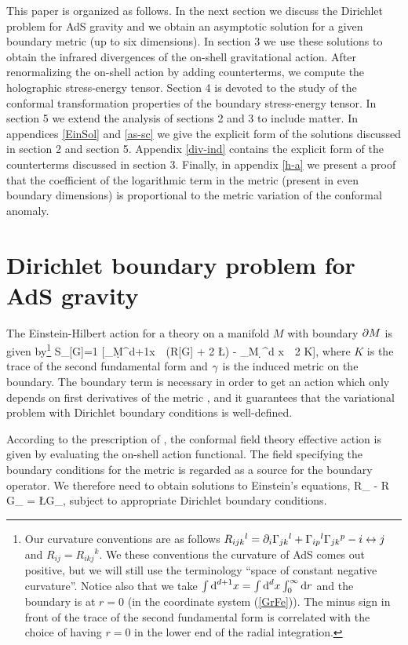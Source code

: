 This paper is organized as follows. In the next section we discuss 
the Dirichlet problem for AdS gravity and we obtain an asymptotic 
solution for a given boundary metric (up to six dimensions).
In section 3 we use these solutions to obtain 
the infrared divergences of the on-shell gravitational action.
After renormalizing the on-shell action by adding counterterms,
we compute the holographic stress-energy tensor. Section 4 is devoted
to the study of the conformal transformation properties of the 
boundary stress-energy tensor. In section 5 we extend the analysis
of sections 2 and 3 to include matter. 
In appendices \ref{EinSol} and \ref{as-sc}
we give  the explicit form of the solutions discussed 
in section 2 and section 5. Appendix \ref{div-ind}
contains the explicit form of the counterterms discussed 
in section 3. 
Finally, in appendix \ref{h-a} we present a proof that the coefficient
of the logarithmic term in the metric (present in even 
boundary dimensions)
is proportional to the metric variation of the conformal anomaly.

\section{Dirichlet boundary problem for AdS gravity}
\setcounter{equation}{0}

The Einstein-Hilbert action for a theory on a manifold $M$ 
with boundary $\partial M$ is given by\footnote{
Our curvature conventions are as follows
$R_{ijk}{}^l=\partial_i \Gamma_{jk}{}^l + \Gamma_{ip}{}^l \Gamma_{jk}{}^p - i
\leftrightarrow j$ and $R_{ij}=R_{ikj}{}^k$. We these conventions
the curvature of AdS comes out positive, but we will 
still use the terminology ``space of constant negative
curvature''. Notice also that we take
$\int \mbox{d}^{d+1} x = \int \mbox{d}^d x \int_0^\infty \mbox{d} r$
and the boundary is at $r=0$ (in the coordinate system (\ref{GrFe})). 
The minus sign in front of the trace of the second 
fundamental form is correlated with the choice of having $r=0$ in 
the lower end of the radial integration.} 
\be \label{action}
S_{}[G]={1  \p \GN}[\int_{M}\d^{d+1}x\, 
\, (R[G] + 2 \L) 
- \int_{\pa M} \d^d x\, \sqrt{\c}\, 2 K],
\ee
where $K$ is the trace of the second fundamental form and
$\gamma$ is the induced metric on the boundary. The 
boundary term is necessary in order to get an action which 
only depends on first derivatives of the metric \cite{GibbonsHawking},
and it guarantees that the variational 
problem with Dirichlet boundary conditions is well-defined.

According to the prescription of \cite{Gubs,Wit}, the conformal 
field theory effective action is given by evaluating the 
on-shell action functional. The field specifying the 
boundary conditions for the metric is regarded as a source 
for the boundary operator. We therefore need to obtain solutions
to Einstein's equations,
\be \label{feq1}
R_{\m \n} - \half R G_{\m \n} = \L G_{\m \n},
\ee
subject to appropriate Dirichlet boundary conditions.


